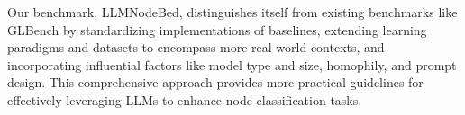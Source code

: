 Our benchmark, LLMNodeBed, distinguishes itself from existing benchmarks like GLBench by standardizing implementations of baselines, extending learning paradigms and datasets to encompass more real-world contexts, and incorporating influential factors like model type and size, homophily, and prompt design. This comprehensive approach provides more practical guidelines for effectively leveraging LLMs to enhance node classification tasks. 


\clearpage
\newpage
